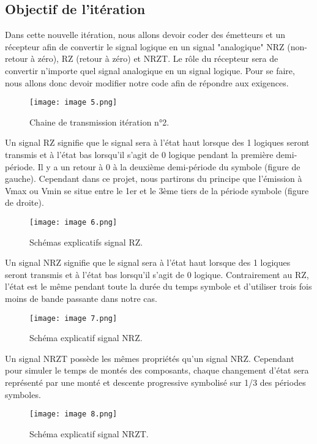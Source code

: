 \subsection{Objectif de l'itération}

Dans cette nouvelle itération, nous allons devoir coder des émetteurs et un récepteur afin de convertir le signal logique en un signal "analogique" NRZ (non-retour à zéro), RZ (retour à zéro) et NRZT. Le rôle du récepteur sera de convertir n'importe quel signal analogique en un signal logique. Pour se faire, nous allons donc devoir modifier notre code afin de répondre aux exigences.

\begin{figure}[h]
    \centering
    \texttt{[image: image 5.png]}
    \caption{\label{fig:image5}Chaine de transmission itération n°2.}
\end{figure}

Un signal RZ signifie que le signal sera à l'état haut lorsque des 1 logiques seront transmis et à l'état bas lorsqu'il s'agit de 0 logique pendant la première demi-période. Il y a un retour à 0 à la deuxième demi-période du symbole (figure de gauche). Cependant dans ce projet, nous partirons du principe que l'émission à Vmax ou Vmin se situe entre le 1er et le 3ème tiers de la période symbole (figure de droite).

\begin{figure}[h]
    \centering
    \texttt{[image: image 6.png]}
    \caption{\label{fig:image6}Schémas explicatifs signal RZ.}
\end{figure}

Un signal NRZ signifie que le signal sera à l'état haut lorsque des 1 logiques seront transmis et à l'état bas lorsqu'il s'agit de 0 logique. Contrairement au RZ, l'état est le même pendant toute la durée du temps symbole et d'utiliser trois fois moins de bande passante dans notre cas.

\begin{figure}[h]
    \centering
    \texttt{[image: image 7.png]}
    \caption{\label{fig:image7}Schéma explicatif signal NRZ.}
\end{figure}

Un signal NRZT possède les mêmes propriétés qu'un signal NRZ. Cependant pour simuler le temps de montés des composants, chaque changement d'état sera représenté par une monté et descente progressive symbolisé sur 1/3 des périodes symboles.

\begin{figure}[h]
    \centering
    \texttt{[image: image 8.png]}
    \caption{\label{fig:image8}Schéma explicatif signal NRZT.}
\end{figure}

